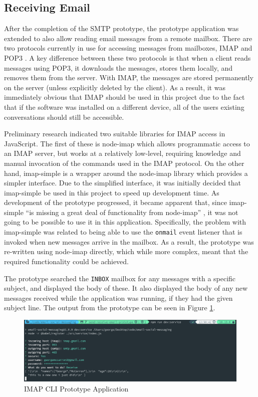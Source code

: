 \subsection{Receiving Email}
After the completion of the SMTP prototype, the prototype application was extended to also allow reading email messages from a remote mailbox. There are two protocols currently in use for accessing messages from mailboxes, IMAP \cite{imap-rfc} and POP3 \cite{pop-rfc}. A key difference between these two protocols is that when a client reads messages using POP3, it downloads the messages, stores them locally, and removes them from the server. With IMAP, the messages are stored permanently on the server (unless explicitly deleted by the client). As a result, it was immediately obvious that IMAP should be used in this project due to the fact that if the software was installed on a different device, all of the users existing conversations should still be accessible.

Preliminary research indicated two suitable libraries for IMAP access in JavaScript. The first of these is node-imap \cite{node-imap} which allows programmatic access to an IMAP server, but works at a relatively low-level, requiring knowledge and manual invocation of the commands used in the IMAP protocol. On the other hand, imap-simple \cite{imap-simple} is a wrapper around the node-imap library which provides a simpler interface. Due to the simplified interface, it was initially decided that imap-simple be used in this project to speed up development time. As development of the prototype progressed, it became apparent that, since imap-simple ``is missing a great deal of functionality from node-imap'' \cite{imap-simple}, it was not going to be possible to use it in this application. 
Specifically, the problem with imap-simple was related to being able to use the \texttt{onmail} event listener that is invoked when new messages arrive in the mailbox. As a result, the prototype was re-written using node-imap directly, which while more complex, meant that the required functionality could be achieved.

The prototype searched the \texttt{INBOX} mailbox for any messages with a specific subject, and displayed the body of these. It also displayed the body of any new messages received while the application was running, if they had the given subject line. The output from the prototype can be seen in Figure \ref{fig:imap-cli}.

\begin{figure}[h!]
  \centering
  \includegraphics[width=\textwidth]{images/imap-cli.png}
  \caption{IMAP CLI Prototype Application}
  \label{fig:imap-cli}
\end{figure}

